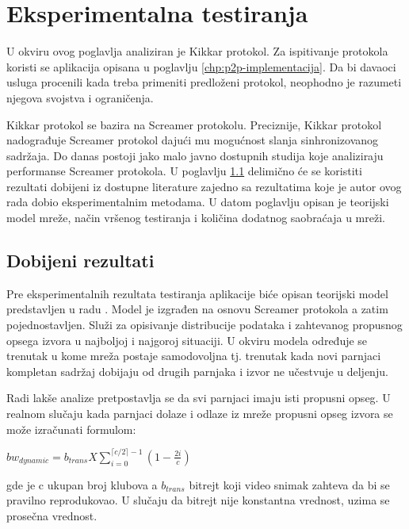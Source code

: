 \documentclass[12pt,oneside]{memoir}
\begin{document}
\chapter{Eksperimentalna testiranja}
\label{chp:testiranja}

U okviru ovog poglavlja analiziran je Kikkar protokol. Za ispitivanje protokola koristi se aplikacija opisana u poglavlju \ref{chp:p2p-implementacija}. Da bi davaoci usluga procenili kada treba primeniti predloženi protokol, neophodno je razumeti njegova svojstva i ograničenja. 

Kikkar protokol se bazira na Screamer protokolu. Preciznije, Kikkar protokol nadograđuje Screamer protokol dajući mu mogućnost slanja sinhronizovanog sadržaja. Do danas postoji jako malo javno dostupnih studija koje analiziraju performanse Screamer protokola. U poglavlju \ref{testiranja.1} delimično će se koristiti rezultati dobijeni iz dostupne literature zajedno sa rezultatima koje je autor ovog rada dobio eksperimentalnim metodama. U datom poglavlju opisan je teorijski model mreže, način vršenog testiranja i količina dodatnog saobraćaja u mreži.

\section{Dobijeni rezultati}
\label{testiranja.1}
Pre eksperimentalnih rezultata testiranja aplikacije biće opisan teorijski model predstavljen u radu \cite{ClubbingWithThePeers}. Model je izgrađen na osnovu Screamer protokola a zatim pojednostavljen. Služi za opisivanje distribucije podataka i zahtevanog propusnog opsega izvora u najboljoj i najgoroj situaciji. U okviru modela određuje se trenutak u kome mreža postaje samodovoljna tj. trenutak kada novi parnjaci kompletan sadržaj dobijaju od drugih parnjaka i izvor ne učestvuje u deljenju. 

Radi lakše analize pretpostavlja se da svi parnjaci imaju isti propusni opseg. U realnom slučaju kada parnjaci dolaze i odlaze iz mreže propusni opseg izvora se može izračunati formulom:

$ bw_{dynamic} = b_{trans} X \sum_{i=0}^{ \lceil c/2 \rceil - 1} ( 1 - \frac{2i}{c}) $

gde je c ukupan broj klubova a $b_{trans}$ bitrejt koji video snimak zahteva da bi se pravilno reprodukovao. U slučaju da bitrejt nije konstantna vrednost, uzima se prosečna vrednost. 
\end{document}
